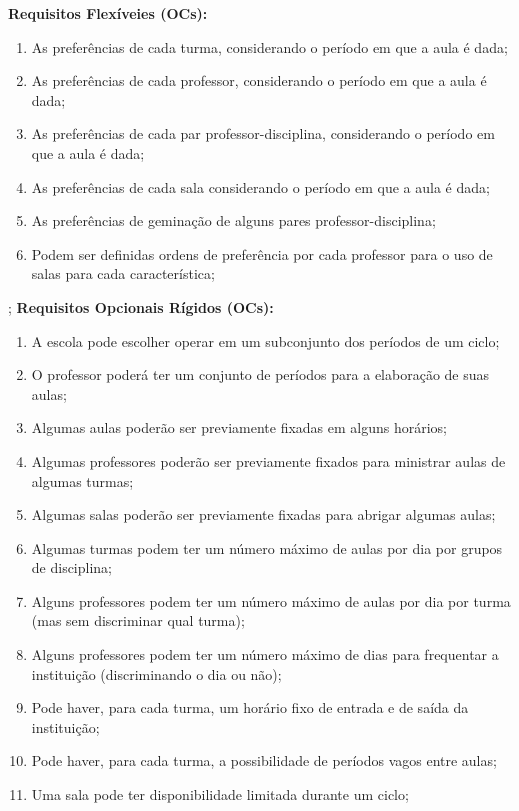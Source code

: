 \documentclass[12pt,a4paper]{article}
\begin{document}
			\textbf{Requisitos Flexíveies (OCs):}
			\begin{enumerate}
				\item As preferências de cada turma, considerando o período em que a aula é dada;
				\item As preferências de cada professor, considerando o período em que a aula é dada;
				\item As preferências de cada par professor-disciplina, considerando o período em que a aula é dada;
				\item As preferências de cada sala considerando o período em que a aula é dada;
				\item As preferências de geminação de alguns pares professor-disciplina;
				\item Podem ser definidas ordens de preferência por cada professor para o uso de salas para cada característica;
			\end{enumerate}
;
			\textbf{Requisitos Opcionais Rígidos (OCs):}
			\begin{enumerate}
				\item A escola pode escolher operar em um subconjunto dos períodos de um ciclo;
				\item O professor poderá ter um conjunto de períodos para a elaboração de suas aulas;
				\item Algumas aulas poderão ser previamente fixadas em alguns horários;
				\item Algumas professores poderão ser previamente fixados para ministrar aulas de algumas turmas;
				\item Algumas salas poderão ser previamente fixadas para abrigar algumas aulas;
				\item Algumas turmas podem ter um número máximo de aulas por dia por grupos de disciplina;
				\item Alguns professores podem ter um número máximo de aulas por dia por turma (mas sem discriminar qual turma);
				\item Alguns professores podem ter um número máximo de dias para frequentar a instituição (discriminando o dia ou não);
				\item Pode haver, para cada turma, um horário fixo de entrada e de saída da instituição;
				\item Pode haver, para cada turma, a possibilidade de períodos vagos entre aulas;
				\item Uma sala pode ter disponibilidade limitada durante um ciclo;
			\end{enumerate}
\end{document}
